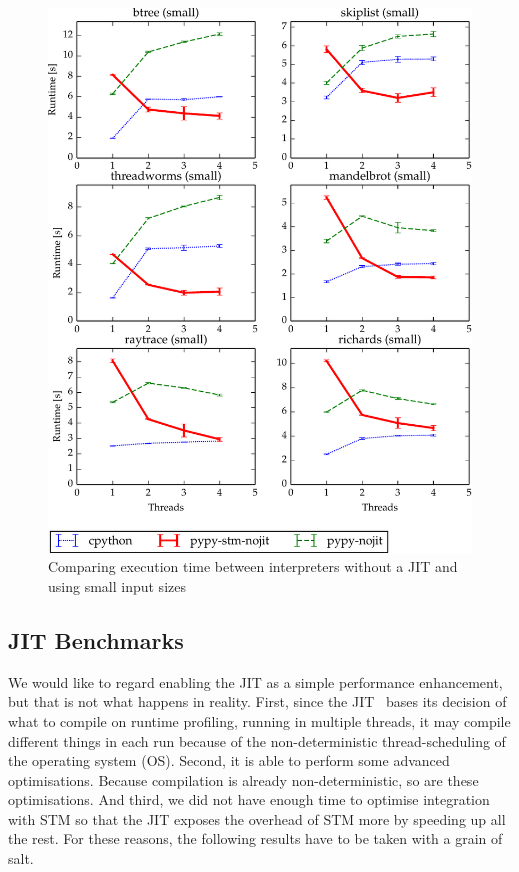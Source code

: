 \documentclass{sigplanconf}
\begin{document}
\begin{figure}[h]
  \centering
  \includegraphics[width=1\columnwidth]{plots/performance_nojit.pdf}
  \caption{Comparing execution time between interpreters without a JIT
    and using small input sizes\label{fig:performance-nojit}}
\end{figure}



\subsection{JIT Benchmarks\label{subsec:jit-benchs}}

We would like to regard enabling the JIT as a simple performance
enhancement, but that is not what happens in reality. First, since the
JIT~\cite{cfbolz09} bases its decision of what to compile on runtime
profiling, running in multiple threads, it may compile different
things in each run because of the non-deterministic thread-scheduling
of the operating system (OS). Second, it is able to perform some
advanced optimisations. Because compilation is already non-deterministic,
so are these optimisations. And third, we did
not have enough time to optimise integration with STM so that the JIT
exposes the overhead of STM more by speeding up all the rest.
For these reasons, the following results have to be taken with a grain
of salt.
\end{document}
